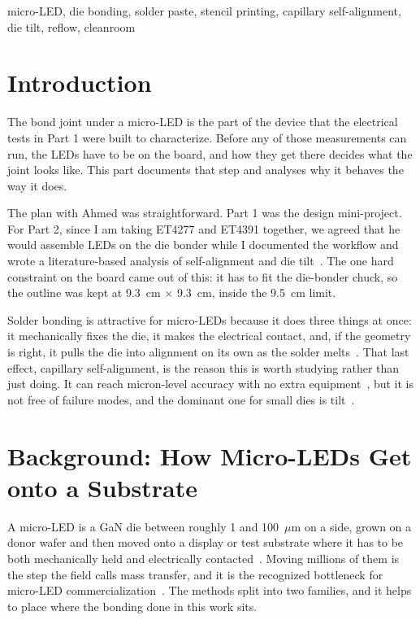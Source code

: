\documentclass[conference]{IEEEtran}
\begin{document}
\begin{IEEEkeywords}
micro-LED, die bonding, solder paste, stencil printing, capillary
self-alignment, die tilt, reflow, cleanroom
\end{IEEEkeywords}

\section{Introduction}

The bond joint under a micro-LED is the part of the device that the
electrical tests in Part 1 were built to characterize. Before any of those
measurements can run, the LEDs have to be on the board, and how they get
there decides what the joint looks like. This part documents that step and
analyses why it behaves the way it does.

The plan with Ahmed was straightforward. Part 1 was the design mini-project.
For Part 2, since I am taking ET4277 and ET4391 together, we agreed that he
would assemble LEDs on the die bonder while I documented the workflow and
wrote a literature-based analysis of self-alignment and die
tilt~\cite{abdelwahab2025ectc}. The one hard constraint on the board came
out of this: it has to fit the die-bonder chuck, so the outline was kept at
9.3~cm $\times$ 9.3~cm, inside the 9.5~cm limit.

Solder bonding is attractive for micro-LEDs because it does three things at
once: it mechanically fixes the die, it makes the electrical contact, and,
if the geometry is right, it pulls the die into alignment on its own as the
solder melts~\cite{mastrangeli2017csa}. That last effect, capillary
self-alignment, is the reason this is worth studying rather than just
doing. It can reach micron-level accuracy with no extra
equipment~\cite{vareilles2024solder}, but it is not free of failure modes,
and the dominant one for small dies is tilt~\cite{berthier2015tilt}.

\section{Background: How Micro-LEDs Get onto a Substrate}

A micro-LED is a GaN die between roughly 1 and 100~$\mu$m on a side, grown on
a donor wafer and then moved onto a display or test substrate where it has
to be both mechanically held and electrically
contacted~\cite{li2020masstransfer}. Moving millions of them is the step the
field calls mass transfer, and it is the recognized bottleneck for micro-LED
commercialization~\cite{li2020masstransfer}. The methods split into two
families, and it helps to place where the bonding done in this work sits.
\end{document}
